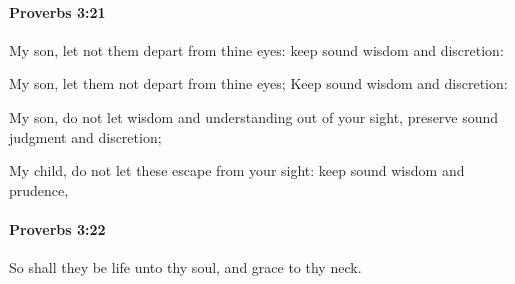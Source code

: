 		\paragraph{Proverbs 3:21} %
			\label{PROVERBS-3-21}

			My son, let not them depart from thine eyes: keep sound wisdom and discretion:

			\begin{versebox}
					\item[BHS] 
					\item[ASV] My son, let them not depart from thine eyes; Keep sound wisdom and discretion:
					\item[NIV] My son, do not let wisdom and understanding out of your sight, preserve sound judgment and discretion;
					\item[NRSV] My child, do not let these escape from your sight: keep sound wisdom and prudence,
			\end{versebox}

		\paragraph{Proverbs 3:22} %
			\label{PROVERBS-3-22}

			So shall they be life unto thy soul, and grace to thy neck.

